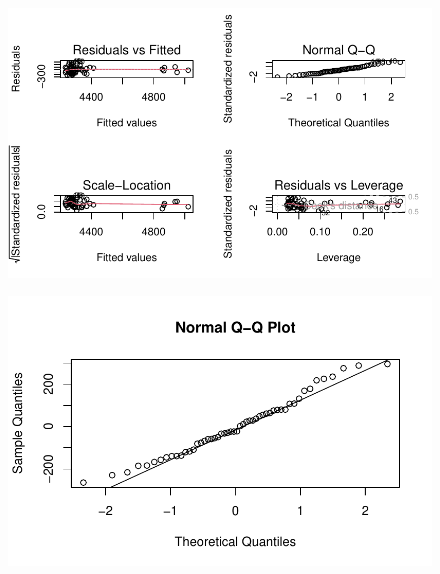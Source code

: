 \documentclass[
  letterpaper,
  DIV=11,
  numbers=noendperiod]{scrartcl}
\newenvironment{Shaded}{\begin{snugshade}}{\end{snugshade}}
\newcommand{\FunctionTok}[1]{\textcolor[rgb]{0.28,0.35,0.67}{#1}}
\newcommand{\NormalTok}[1]{\textcolor[rgb]{0.00,0.23,0.31}{#1}}
\newcommand{\SpecialCharTok}[1]{\textcolor[rgb]{0.37,0.37,0.37}{#1}}
\begin{document}
\begin{figure}[H]

{\centering \includegraphics{sta9700_herlan_ch6_2023_04_12_files/figure-pdf/unnamed-chunk-11-1.pdf}

}

\end{figure}

\begin{Shaded}
\end{Shaded}

\begin{figure}[H]

{\centering \includegraphics{sta9700_herlan_ch6_2023_04_12_files/figure-pdf/unnamed-chunk-12-1.pdf}

}

\end{figure}
\end{document}
